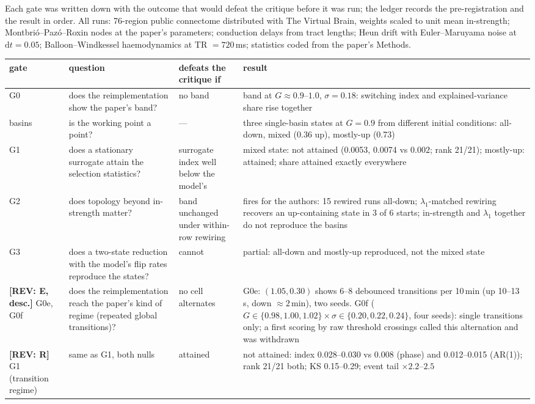 \documentclass[11pt]{article}
\newcommand{\REV}[1]{\textcolor{purple!70!black}{\textbf{[REV: #1]}}}
\begin{document}
Each gate was written down with the outcome that would defeat the critique before it was run; the ledger records the pre-registration and the result in order. All runs: 76-region public connectome distributed with The Virtual Brain, weights scaled to unit mean in-strength; Montbri\'o--Paz\'o--Roxin nodes at the paper's parameters; conduction delays from tract lengths; Heun drift with Euler--Maruyama noise at $\mathrm{d}t=0.05$; Balloon--Windkessel haemodynamics at TR $=720$\,ms; statistics coded from the paper's Methods.
\begin{center}\small
\begin{tabular}{@{}>{\raggedright\arraybackslash}p{1.5cm}>{\raggedright\arraybackslash}p{4.0cm}>{\raggedright\arraybackslash}p{3.4cm}>{\raggedright\arraybackslash}p{5.4cm}@{}}
\toprule
gate & question & defeats the critique if & result \\
\midrule
G0 & does the reimplementation show the paper's band? & no band & band at $G\approx0.9$--$1.0$, $\sigma=0.18$: switching index and explained-variance share rise together \\
basins & is the working point a point? & --- & three single-basin states at $G=0.9$ from different initial conditions: all-down, mixed (0.36 up), mostly-up (0.73) \\
G1 & does a stationary surrogate attain the selection statistics? & surrogate index well below the model's & mixed state: not attained (0.0053, 0.0074 vs $0.002$; rank 21/21); mostly-up: attained; share attained exactly everywhere \\
G2 & does topology beyond in-strength matter? & band unchanged under within-row rewiring & fires for the authors: 15 rewired runs all-down; $\lambda_1$-matched rewiring recovers an up-containing state in 3 of 6 starts; in-strength and $\lambda_1$ together do not reproduce the basins \\
G3 & does a two-state reduction with the model's flip rates reproduce the states? & cannot & partial: all-down and mostly-up reproduced, not the mixed state \\
\REV{E, desc.} G0e, G0f & does the reimplementation reach the paper's kind of regime (repeated global transitions)? & no cell alternates & G0e: $(1.05,0.30)$ shows 6--8 debounced transitions per 10\,min (up 10--13\,s, down $\approx 2$\,min), two seeds. G0f ($G\in\{0.98,1.00,1.02\}\times\sigma\in\{0.20,0.22,0.24\}$, four seeds): single transitions only; a first scoring by raw threshold crossings called this alternation and was withdrawn \\
\REV{R} G1 (transition regime) & same as G1, both nulls & attained & not attained: index 0.028--0.030 vs 0.008 (phase) and 0.012--0.015 (AR(1)); rank 21/21 both; KS 0.15--0.29; event tail $\times 2.2$--$2.5$ \\
\bottomrule
\end{tabular}
\end{center}

\printbibliography
\end{document}
